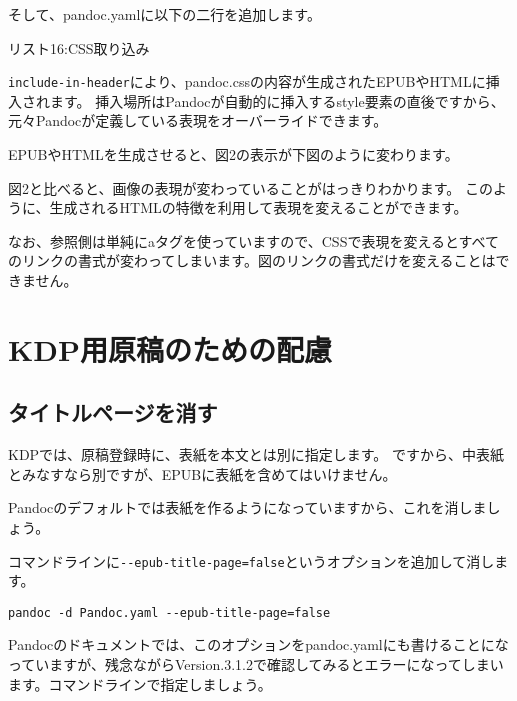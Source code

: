 そして、pandoc.yamlに以下の二行を追加します。

リスト16:CSS取り込み

\begin{Shaded}
\begin{Highlighting}[]
\KeywordTok{:}
\AttributeTok{    }\KeywordTok{{-}}
\end{Highlighting}
\end{Shaded}

\texttt{include-in-header}により、pandoc.cssの内容が生成されたEPUBやHTMLに挿入されます。
挿入場所はPandocが自動的に挿入するstyle要素の直後ですから、元々Pandocが定義している表現をオーバーライドできます。

EPUBやHTMLを生成させると、図2の表示が下図のように変わります。

図2と比べると、画像の表現が変わっていることがはっきりわかります。
このように、生成されるHTMLの特徴を利用して表現を変えることができます。

なお、参照側は単純にaタグを使っていますので、CSSで表現を変えるとすべてのリンクの書式が変わってしまいます。図のリンクの書式だけを変えることはできません。

\chapter{KDP用原稿のための配慮}\label{kdpux7528ux539fux7a3fux306eux305fux3081ux306eux914dux616e}

\section{タイトルページを消す}\label{ux30bfux30a4ux30c8ux30ebux30daux30fcux30b8ux3092ux6d88ux3059}

KDPでは、原稿登録時に、表紙を本文とは別に指定します。
ですから、中表紙とみなすなら別ですが、EPUBに表紙を含めてはいけません。

Pandocのデフォルトでは表紙を作るようになっていますから、これを消しましょう。

コマンドラインに\texttt{-\/-epub-title-page=false}というオプションを追加して消します。

\begin{verbatim}
pandoc -d Pandoc.yaml --epub-title-page=false
\end{verbatim}

Pandocのドキュメントでは、このオプションをpandoc.yamlにも書けることになっていますが、残念ながらVersion.3.1.2で確認してみるとエラーになってしまいます。コマンドラインで指定しましょう。

